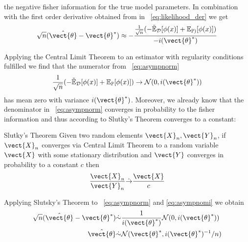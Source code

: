       the negative fisher information for the true model parameters.
      In combination with the first order derivative obtained from in \eq~\ref{eq:likelihood_der} we get 
      \begin{equation}
        \label{eq:asympnorm}
          \begin{split}
            \sqrt{n}(\hat{\vect{\theta}} - \vect{\theta}^*)  &\approx - \frac{\frac{1}{\sqrt{n}}( -\tilde{\mathbb{E}}_{\mathcal{D}}[\phi(x)] + \mathbb{E}_{\mathbb{P})}[\phi(x)])}{- i(\vect{\theta}^*)} \\
          \end{split}
      \end{equation}

      Applying the Central Limit Theorem to an estimator with regularity conditions fulfilled we find  that the numerator from \eq~\ref{eq:asympnorm}
        \begin{equation}
            \label{eq:asympnomi}
            \frac{1}{\sqrt{n}} ( -\tilde{\mathbb{E}}_{\mathcal{D}}[\phi(x)] + \mathbb{E}_{\mathbb{P}}[\phi(x)]) \rightarrow \mathcal{N}(0, i(\vect{\theta}^*))
        \end{equation}
        has mean zero with variance $i(\vect{\theta}^*)$.
        Moreover, we already know that the denominator in \eq~\ref{eq:asympnorm} converges in probability to the fisher information and thus according to Slutky's Theorem converges to a constant:

        \begin{threm}{Slutky's Theorem \cite{casella2002statistical}}
            Given two random elements $\vect{X}_n, \vect{Y}_n$, if $\vect{X}_n$ converges via Central Limit Theorem to a random variable $\vect{X}$ with some stationary distribution and $\vect{Y}$ converges in probability to a constant $c$ then 
            \begin{equation}
                \frac{\vect{X}_n}{\vect{Y}_n} \dot{\rightarrow} \frac{\vect{X}}{c}
            \end{equation}
        \end{threm}

        Applying Slutsky's Theorem to \eq~\ref{eq:asympnorm} and \ref{eq:asympnomi} we obtain 
        \begin{equation}
            \begin{split}
            \sqrt{n}(\hat{\vect{\theta}} - \vect{\theta}^*)  &\dot{\sim} \frac{1}{ i(\vect{\theta}^*)} \mathcal{N}(0, i(\vect{\theta}^*)) \\
            \hat{\vect{\theta}} &\dot{\sim} \mathcal{N}(\vect{\theta}^*, i(\vect{\theta}^*)^{-1}/n)\\
        \end{split}
        \end{equation}

